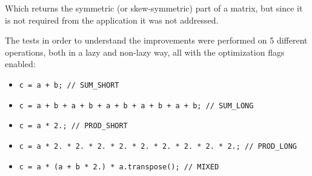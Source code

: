 \documentclass{article}
\begin{document}
Which returns the symmetric (or skew-symmetric) part of a matrix, but since it is not required from the application it was not addressed.

The tests in order to understand the improvements were performed on 5 different operations, both in a lazy and non-lazy way, all with the optimization flags enabled:

\begin{itemize}
    \item \texttt{c = a + b; // SUM\_SHORT}
    \item \texttt{c = a + b + a + b + a + b + a + b + a + b; // SUM\_LONG}
    \item \texttt{c = a * 2.; // PROD\_SHORT}
    \item \texttt{c = a * 2. * 2. * 2. * 2. * 2. * 2. * 2. * 2. * 2.; // PROD\_LONG}
    \item \texttt{c = a * (a + b * 2.) * a.transpose(); // MIXED}
\end{itemize}
\end{document}
